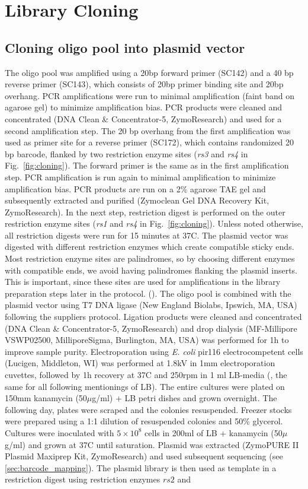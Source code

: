 \section{Library Cloning}
\subsection{Cloning oligo pool into plasmid vector}
\label{sec:library_cloning}
The oligo pool was amplified using a 20bp forward primer (SC142) and a 40 bp reverse primer (SC143), which consists of 20bp primer binding site and 20bp overhang. PCR amplifications were run to minimal amplification (faint band on agarose gel) to minimize amplification bias. PCR products were cleaned and concentrated (DNA Clean \& Concentrator-5, ZymoResearch) and used for a second amplification step. The 20 bp overhang from the first amplification was used as primer site for a reverse primer (SC172), which contains randomized 20 bp barcode, flanked by two restriction enzyme sites (\textit{rs3} and \textit{rs4} in Fig.~\ref{fig:cloning}). The forward primer is the same as in the first amplification step. PCR amplification is run again to minimal amplification to minimize amplification bias. PCR products are run on a 2\% agarose TAE gel and subsequently extracted and purified (Zymoclean Gel DNA Recovery Kit, ZymoResearch). In the next step, restriction digest is performed on the outer restriction enzyme sites (\textit{rs1} and \textit{rs4} in Fig.~\ref{fig:cloning}). Unless noted otherwise, all restriction digests were run for 15 minutes at 37C. The plasmid vector was digested with different restriction enzymes which create compatible sticky ends. Most restriction enzyme sites are palindromes, so by choosing different enzymes with compatible ends, we avoid having palindromes flanking the plasmid inserts. This is important, since these sites are used for amplifications in the library preparation steps later in the protocol. (). The oligo pool is combined with the plasmid vector using T7 DNA ligase (New England Biolabs, Ipswich, MA, USA) following the suppliers protocol. Ligation products were cleaned and concentrated (DNA Clean \& Concentrator-5, ZymoResearch) and drop dialysis (MF-Millipore VSWP02500, MilliporeSigma, Burlington, MA, USA)  was performed for 1h to improve sample purity. Electroporation using \textit{E. coli} pir116 electrocompetent cells (Lucigen, Middleton, WI) was performed at 1.8kV in 1mm electroporation cuvettes, followed by 1h recovery at 37C and 250rpm in 1 ml LB-media (, the same for all following mentionings of LB). The entire cultures were plated on 150mm kanamycin (50$\mu$g/ml) + LB petri dishes and grown overnight. The following day, plates were scraped and the colonies resuspended. Freezer stocks were prepared using a 1:1 dilution of resuspended colonies and 50\% glycerol. Cultures were inoculated with $5\times 10^8$ cells in 200ml of LB + kanamycin (50$\mu$g/ml) and grown at 37C until saturation. Plasmid was extracted (ZymoPURE II Plasmid Maxiprep Kit, ZymoResearch) and used subsequent sequencing (see \ref{sec:barcode_mapping}). The plasmid library is then used as template in a restriction digest using restriction enzymes $rs2$ and 